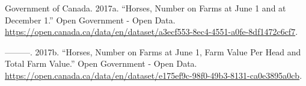 \documentclass[
  letterpaper,
  DIV=11,
  numbers=noendperiod]{scrartcl}
\newlength{\cslhangindent}
\newenvironment{CSLReferences}[2] %
 {\begin{list}{}{%
  \setlength{\itemindent}{0pt}
  \setlength{\leftmargin}{0pt}
  \setlength{\parsep}{0pt}
  \ifodd #1
   \setlength{\leftmargin}{\cslhangindent}
   \setlength{\itemindent}{-1\cslhangindent}
  \fi
  \setlength{\itemsep}{#2\baselineskip}}}
 {\end{list}}
\begin{document}
\label{refs}
\begin{CSLReferences}{1}{0}
Government of Canada. 2017a. {``Horses, Number on Farms at June 1 and at
December 1.''} Open Government - Open Data.
\url{https://open.canada.ca/data/en/dataset/a3ecf553-8ec4-4551-a0fe-8df1472c6cf7}.

---------. 2017b. {``Horses, Number on Farms at June 1, Farm Value Per
Head and Total Farm Value.''} Open Government - Open Data.
\url{https://open.canada.ca/data/en/dataset/e175ef9c-98f0-49b3-8131-ca0e3895a0cb}.

\end{CSLReferences}
\end{document}
